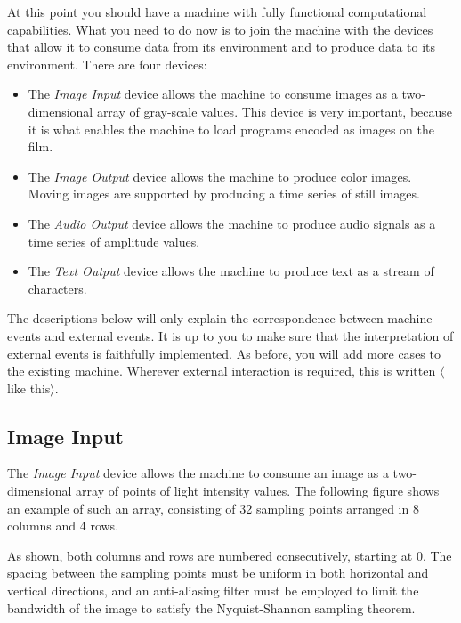\documentclass[a4paper,12pt]{article}
\newcommand{\deviceio}[1]{$\langle$#1$\rangle$}
\theoremstyle{definition}
\begin{document}
At this point you should have a machine with fully functional computational capabilities.
What you need to do now is to join the machine with the devices that allow it to consume data from its environment and to produce data to its environment.
There are four devices:
\begin{itemize}
\item The \emph{Image Input} device allows the machine to consume images as a two-dimensional array of gray-scale values.
  This device is very important, because it is what enables the machine to load programs encoded as images on the film.
\item The \emph{Image Output} device allows the machine to produce color images.
  Moving images are supported by producing a time series of still images.
\item The \emph{Audio Output} device allows the machine to produce audio signals as a time series of amplitude values.
\item The \emph{Text Output} device allows the machine to produce text as a stream of characters.
\end{itemize}
The descriptions below will only explain the correspondence between machine events and external events.
It is up to you to make sure that the interpretation of external events is faithfully implemented.
As before, you will add more cases to the existing machine.
Wherever external interaction is required, this is written \deviceio{like this}.

\subsection{Image Input}

The \emph{Image Input} device allows the machine to consume an image as a two-dimensional array of points of light intensity values.
The following figure shows an example of such an array, consisting of 32 sampling points arranged in 8 columns and 4 rows.
\begin{center}
\end{center}
As shown, both columns and rows are numbered consecutively, starting at 0.
The spacing between the sampling points must be uniform in both horizontal and vertical directions, and an anti-aliasing filter must be employed to limit the bandwidth of the image to satisfy the Nyquist-Shannon sampling theorem.
\end{document}
